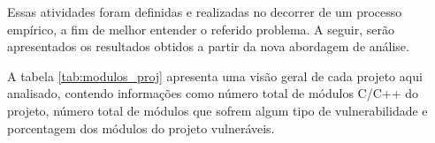 Essas atividades foram definidas e realizadas no decorrer de um processo empírico, a fim de melhor
entender o referido problema. A seguir, serão apresentados os resultados obtidos a partir da nova
abordagem de análise.

A tabela \ref{tab:modulos_proj} apresenta uma visão geral de cada projeto aqui analisado, contendo
informações como número total de módulos C/C++ do projeto, número total de módulos que sofrem
algum tipo de vulnerabilidade e porcentagem dos módulos do projeto vulneráveis.

\begin{table}[h]
\caption{Análise de Módulos por Projeto}
\label{tab:modulos_proj}
\end{table}

